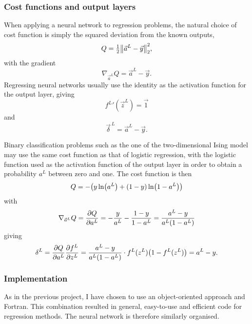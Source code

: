 \documentclass[11pt,british,a4paper]{article}
\numberwithin{equation}{section}
\begin{document}
\subsubsection{Cost functions and output layers}
When applying a neural network to regression problems, the natural choice of cost function is simply the squared deviation from the known outputs,
\begin{equation}
    Q = \tfrac{1}{2}\norm{\vec{a}^L - \vec{y}}_2^2,
\end{equation}
with the gradient
\begin{equation}
    \nabla_{\vec{a}^L} Q = \vec{a}^L - \vec{y}.
\end{equation}
Regressing neural networks usually use the identity as the activation function for the output layer, giving
\begin{equation}
    {f^L}'(\vec{z}^L) = \vec{1}
\end{equation}
and
\begin{equation}
    \vec{\delta}^{\,L} = \vec{a}^L - \vec{y}.
\end{equation}

Binary classification problems such as the one of the two-dimensional Ising model may use the same cost function as that of logistic regression, with the logistic function used as the activation function of the output layer in order to obtain a probability \(a^L\) between zero and one.
The cost function is then
\begin{equation}
    Q = -\qty(y\ln(a^L) + (1 - y)\ln(1-a^L))
\end{equation}
with
\begin{equation}
    \nabla_{\vec{a}^L} Q = \pdv{Q}{a^L} = -\frac{y}{a^L} - \frac{1-y}{1-a^L}
                         = \frac{a^L - y}{a^L\qty(1-a^L)}
\end{equation}
giving
\begin{equation}
    \delta^L = \pdv{Q}{a^L} \pdv{f^L}{z^L}
             = \frac{a^L - y}{a^L\qty(1-a^L)} \cdot f^L(z^L)\qty(1-f^L(z^L))
             = a^L - y.
\end{equation}

\subsubsection{Implementation}
As in the previous project, I have chosen to use an object-oriented approach and Fortran. This combination resulted in general, easy-to-use and efficient code for regression methods. The neural network is therefore similarly organised.
\end{document}
